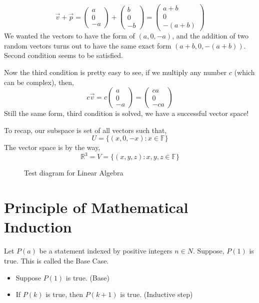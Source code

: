 \documentclass[a4paper]{article}
\begin{document}
\[
\vec{v} + \vec{p} = \begin{pmatrix} a \\ 0 \\ -a\end{pmatrix}  
+ 
\begin{pmatrix} b \\ 0 \\ -b \end{pmatrix} = 
\begin{pmatrix} a + b \\ 0 \\ - \left(a + b\right) \end{pmatrix} 
\] 
We wanted the vectors to have the form of $(a,0,-a)$, and the addition of two random vectors turns out to have the same exact form $(a+b, 0, -(a+b))$. Second condition seems to be satisfied. 

Now the third condition is pretty easy to see, if we multiply any number $c$ (which can be complex), then, 
\[
c \vec{v} = c \begin{pmatrix} a \\ 0 \\ -a \end{pmatrix}  = 
\begin{pmatrix} ca \\ 0 \\ -ca \end{pmatrix} 
\] 
Still the same form, third condition is solved, we have a successful vector space!

To recap, our subspace is set of all vectors such that, 
\[
U = \{ 
	(x, 0, -x) : x \in \mathbb{F}
\}
\]
The vector space is by the way,
\[
\mathbb{R}^3 = V = \{
	(x,y,z) : x,y,z \in \mathbb{F}
\}
\]
\begin{figure}[ht]
    \centering
    \caption{Test diagram for Linear Algebra}
    \label{fig:test-diagram-for-linear-algebra}
\end{figure}


\section{Principle of Mathematical Induction}
Let $P(a)$ be a statement indexed by positive integers $n \in N$. Suppose, $P(1)$ is true. This is called the Base Case.

\begin{itemize}
	\item Suppose $P(1)$ is true. (Base)
	\item If $P(k)$ is true, then $P(k+1)$ is true. (Inductive step)
\end{itemize}
 
\end{document}
